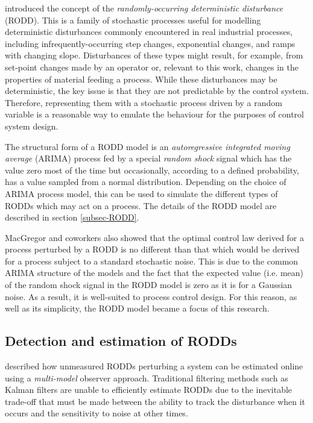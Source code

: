 \cite{macgregor_duality_1984} introduced the concept of the \textit{randomly-occurring deterministic disturbance} (RODD). This is a family of stochastic processes useful for modelling deterministic disturbances commonly encountered in real industrial processes, including  infrequently-occurring step changes, exponential changes, and ramps with changing slope. Disturbances of these types might result, for example, from set-point changes made by an operator or, relevant to this work, changes in the properties of material feeding a process. While these disturbances may be deterministic, the key issue is that they are not predictable by the control system. Therefore, representing them with a stochastic process driven by a random variable is a reasonable way to emulate the behaviour for the purposes of control system design.

The structural form of a RODD model is an \textit{autoregressive integrated moving average} (ARIMA) process fed by a special \textit{random shock} signal which has the value zero most of the time but occasionally, according to a defined probability, has a value sampled from a normal distribution. Depending on the choice of ARIMA process model, this can be used to simulate the different types of RODDs which may act on a process. The details of the RODD model are described in section \ref{subsec-RODD}.

MacGregor and coworkers also showed that the optimal control law derived for a process perturbed by a RODD is no different than that which would be derived for a process subject to a standard stochastic noise.  This is due to the common ARIMA structure of the models and the fact that the expected value (i.e. mean) of the random shock signal in the RODD model is zero as it is for a Gaussian noise. As a result, it is well-suited to process control design. For this reason, as well as its simplicity, the RODD model became a focus of this research.

\subsection{Detection and estimation of RODDs}\label{detection_RODDs}

\cite{robertson_detection_1995} described how unmeasured RODDs perturbing a system can be estimated online using a \textit{multi-model} observer approach. Traditional filtering methods such as Kalman filters are unable to efficiently estimate RODDs due to the inevitable trade-off that must be made between the ability to track the disturbance when it occurs and the sensitivity to noise at other times.

